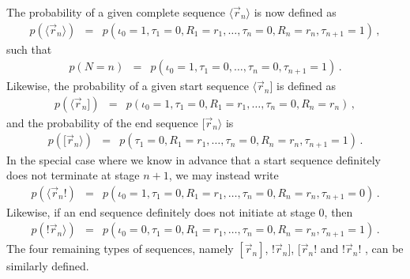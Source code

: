 \documentclass[a4paper]{article}
\begin{document}
The probability of a given complete sequence $\langle\vec{r}_n\rangle$ is now defined as
\begin{eqnarray}
   p(\langle\vec{r}_n\rangle)
& = & p(\iota_0\!=\!1,\tau_1\!=\!0,R_1=r_1,\ldots,\tau_n\!=\!0,R_n=r_n,\tau_{n+1}\!=\!1)
\,,
\end{eqnarray}
such that 
\begin{eqnarray}
   p(N\!=\!n) & = &  p(\iota_0\!=\!1,\tau_1\!=\!0,\ldots,\tau_n\!=\!0,\tau_{n+1}\!=\!1)\,.
\end{eqnarray}
Likewise, the probability
of a given start sequence $\langle\vec{r}_n]$ is defined as
\begin{eqnarray}
p(\langle\vec{r}_n]) 
& = & p(\iota_0\!=\!1,\tau_1\!=\!0,R_1=r_1,\ldots,\tau_n\!=\!0,R_n=r_n)\,,
\end{eqnarray}
and the probability of the end sequence $[\vec{r}_n\rangle$ is
\begin{eqnarray}
p([\vec{r}_n\rangle)
& = & p(\tau_1\!=\!0,R_1=r_1,\ldots,\tau_n\!=\!0,R_n=r_n,\tau_{n+1}\!=\!1)\,.
\end{eqnarray}
In the special case where we know in advance that a start sequence definitely does not terminate
at stage $n+1$,  we may instead write
\begin{eqnarray}
p(\langle\vec{r}_n!)
& = & p(\iota_0\!=\!1,\tau_1\!=\!0,R_1=r_1,\ldots,\tau_n\!=\!0,R_n=r_n,\tau_{n+1}\!=\!0)\,.
\end{eqnarray}
Likewise, if an end sequence definitely does not initiate at stage 0, then
\begin{eqnarray}
p(!\vec{r}_n\rangle)
& = & p(\iota_0\!=\!0,\tau_1\!=\!0,R_1=r_1,\ldots,\tau_n\!=\!0,R_n=r_n,\tau_{n+1}\!=\!1)\,.
\end{eqnarray}
The four remaining types of sequences, namely $[\vec{r}_n]$, $!\vec{r}_n]$, $[\vec{r}_n!$ and $!\vec{r}_n!$ , can be similarly defined.

\end{document}
